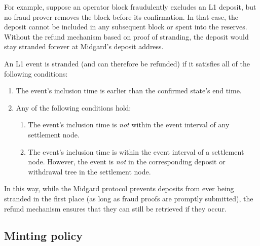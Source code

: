 \documentclass[../midgard.tex]{subfiles}
\begin{document}
For example, suppose an operator block fraudulently excludes an L1 deposit, but no fraud prover removes the block before its confirmation.
In that case, the deposit cannot be included in any subsequent block or spent into the reserves.
Without the refund mechanism based on proof of stranding, the deposit would stay stranded forever at Midgard's deposit address.

An L1 event is stranded (and can therefore be refunded) if it satisfies all of the following conditions:
\begin{enumerate}
  \item The event's inclusion time is earlier than the confirmed state's end time.
  \item Any of the following conditions hold:
    \begin{enumerate}
      \item The event's inclusion time is \emph{not} within the event interval of any settlement node.
      \item The event's inclusion time is within the event interval of a settlement node.
        However, the event is \emph{not} in the corresponding deposit or withdrawal tree in the settlement node.
    \end{enumerate}
\end{enumerate}

In this way, while the Midgard protocol prevents deposits from ever being stranded in the first place (as long as fraud proofs are promptly submitted), the refund mechanism ensures that they can still be retrieved if they occur.

\subsection{Minting policy}
\label{h:settlement-queue-minting-policy}
\end{document}
